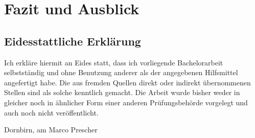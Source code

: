 \documentclass[a4paper, fontsize=11pt, parskip=half, twoside]{scrreprt}
\begin{document}
	
	
	\chapter{Fazit und Ausblick}
	
	
	\clearpage
	\printbibliography
	
	\clearpage
	\section*{Eidesstattliche Erklärung}
	Ich erkläre hiermit an Eides statt, dass ich vorliegende Bachelorarbeit selbstständig und ohne Benutzung anderer als der angegebenen Hilfsmittel angefertigt habe. 
	Die aus fremden Quellen direkt oder indirekt übernommenen Stellen sind als solche kenntlich gemacht. 
	Die Arbeit wurde bisher weder in gleicher noch in ähnlicher Form einer anderen Prüfungsbehörde vorgelegt und auch noch nicht veröffentlicht.
	
	\vspace{3cm}
	\noindent
	Dornbirn, am  \hfill Marco Prescher
	
	
\end{document}
